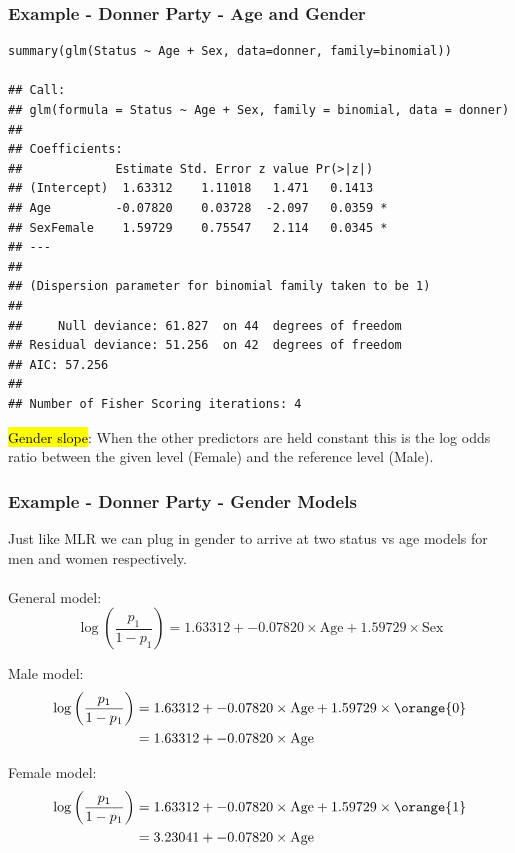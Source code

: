 
\begin{frame}[fragile]
\frametitle{Example - Donner Party - Age and Gender}
\vspace{-3mm}
{\tiny
\begin{verbatim}
summary(glm(Status ~ Age + Sex, data=donner, family=binomial))

## Call:
## glm(formula = Status ~ Age + Sex, family = binomial, data = donner)
## 
## Coefficients:
##             Estimate Std. Error z value Pr(>|z|)  
## (Intercept)  1.63312    1.11018   1.471   0.1413  
## Age         -0.07820    0.03728  -2.097   0.0359 *
## SexFemale    1.59729    0.75547   2.114   0.0345 *
## ---
## 
## (Dispersion parameter for binomial family taken to be 1)
## 
##     Null deviance: 61.827  on 44  degrees of freedom
## Residual deviance: 51.256  on 42  degrees of freedom
## AIC: 57.256
## 
## Number of Fisher Scoring iterations: 4
\end{verbatim}
}

\hl{Gender slope}: When the other predictors are held constant this is the log odds ratio between the given level (Female) and the reference level (Male).

\end{frame}


\begin{frame}
\frametitle{Example - Donner Party - Gender Models}

Just like MLR we can plug in gender to arrive at two status vs age models for men and women respectively.\\
~\\

General model:
{\scriptsize
\[\log\left(\frac{p_1}{1-p_1}\right) = 1.63312 + -0.07820\times\text{Age} + 1.59729\times\text{Sex}\]
}

Male model:
{\scriptsize
\begin{align*}
\log\left(\frac{p_1}{1-p_1}\right) &= 1.63312 + -0.07820\times\text{Age} + 1.59729\times\orange{0}\\
                                   &= 1.63312 + -0.07820\times\text{Age}
\end{align*}
}

Female model:
{\scriptsize
\begin{align*}
\log\left(\frac{p_1}{1-p_1}\right) &= 1.63312 + -0.07820\times\text{Age} + 1.59729\times\orange{1}\\
                                   &= 3.23041 + -0.07820\times\text{Age}
\end{align*}
}

\end{frame}

